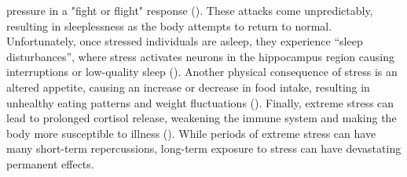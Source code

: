 \documentclass[12pt, a4paper, twoside]{article}
\begin{document}
pressure in a "fight or flight" response (\cite{sha2023}). These attacks come unpredictably, resulting in sleeplessness as the body attempts to return to normal. Unfortunately, once stressed individuals are asleep, they experience “sleep disturbances”, where stress activates neurons in the hippocampus region causing interruptions or low-quality sleep (\cite{mcleod2012}). Another physical consequence of stress is an altered appetite, causing an increase or decrease in food intake, resulting in unhealthy eating patterns and weight fluctuations (\cite{sha2023}). Finally, extreme stress can lead to prolonged cortisol release, weakening the immune system and making the body more susceptible to illness (\cite{cordovaolivera2023}). While periods of extreme stress can have many short-term repercussions, long-term exposure to stress can have devastating permanent effects.
\end{document}
